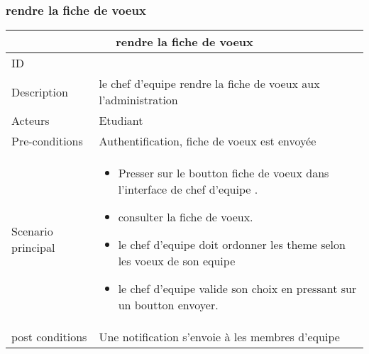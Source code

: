 \documentclass[11pt,fleqn]{book} %
\begin{document}
\subsubsection{rendre la fiche de voeux}
\begin{center}
\begin{tabularx}{1\textwidth} { | p{4cm} | >{\raggedright\arraybackslash}X |  }
  \hline
  \multicolumn{2}{|c|}{rendre la fiche de voeux} \\
 \hline
 ID & 4  \\
 \hline
 Description  & le chef d'equipe rendre la fiche de voeux aux l'administration   \\
  \hline
 Acteurs  & Etudiant   \\
  \hline
 Pre-conditions  & Authentification, fiche de voeux est envoyée\\
 \hline
 Scenario principal  &  
 \begin{itemize}
     \item Presser sur le boutton fiche de voeux dans l’interface de chef d’equipe .
     \item consulter la fiche de voeux.
     \item le chef d’equipe doit ordonner les theme selon les voeux de son equipe
     \item le chef d’equipe valide son choix en pressant sur un boutton envoyer.

 \end{itemize}\\
  \hline
 post conditions  &  Une notification s’envoie à les membres d'equipe  \\
  \hline
\end{tabularx}
\label{tbl:nicetablelesstable}
\end{center}
\end{document}
